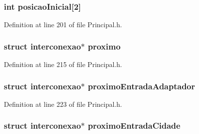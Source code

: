 \hypertarget{structinterconexao_a2584a890a5daa3979c8f5def66b37a93}{
\subsubsection[{posicao\-Inicial}]{\setlength{\rightskip}{0pt plus 5cm}int posicao\-Inicial\mbox{[}2\mbox{]}}}\label{structinterconexao_a2584a890a5daa3979c8f5def66b37a93}


Definition at line 201 of file Principal.\-h.

\hypertarget{structinterconexao_a1cf2ab988ac89d1e06938f7149fb2b39}{
\subsubsection[{proximo}]{\setlength{\rightskip}{0pt plus 5cm}struct {\bf interconexao}$\ast$ proximo}}\label{structinterconexao_a1cf2ab988ac89d1e06938f7149fb2b39}


Definition at line 215 of file Principal.\-h.

\hypertarget{structinterconexao_a3378cab97ff6faca1fed5284f60899ee}{
\subsubsection[{proximo\-Entrada\-Adaptador}]{\setlength{\rightskip}{0pt plus 5cm}struct {\bf interconexao}$\ast$ proximo\-Entrada\-Adaptador}}\label{structinterconexao_a3378cab97ff6faca1fed5284f60899ee}


Definition at line 223 of file Principal.\-h.

\hypertarget{structinterconexao_a12754d0ee6ed8698342735cb34b9abae}{
\subsubsection[{proximo\-Entrada\-Cidade}]{\setlength{\rightskip}{0pt plus 5cm}struct {\bf interconexao}$\ast$ proximo\-Entrada\-Cidade}}\label{structinterconexao_a12754d0ee6ed8698342735cb34b9abae}


